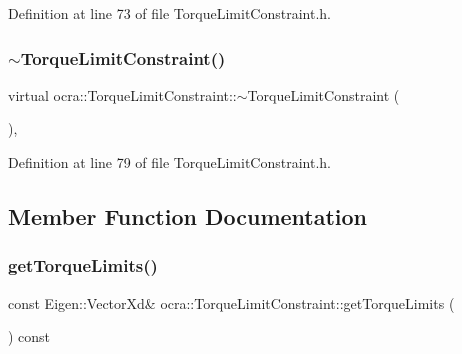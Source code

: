 Definition at line 73 of file Torque\+Limit\+Constraint.\+h.

\hypertarget{classocra_1_1TorqueLimitConstraint_a893e34cf1ab2a6faf59bf394e769bbe3}{}\label{classocra_1_1TorqueLimitConstraint_a893e34cf1ab2a6faf59bf394e769bbe3} 
\subsubsection{\texorpdfstring{$\sim$\+Torque\+Limit\+Constraint()}{~TorqueLimitConstraint()}}
{\footnotesize\ttfamily virtual ocra\+::\+Torque\+Limit\+Constraint\+::$\sim$\+Torque\+Limit\+Constraint (\begin{DoxyParamCaption}{ }\end{DoxyParamCaption})\hspace{0.3cm}{\ttfamily [inline]}, {\ttfamily [virtual]}}



Definition at line 79 of file Torque\+Limit\+Constraint.\+h.



\subsection{Member Function Documentation}
\hypertarget{classocra_1_1TorqueLimitConstraint_a34f89a0c633bf6a8cabf79f9d6d22871}{}\label{classocra_1_1TorqueLimitConstraint_a34f89a0c633bf6a8cabf79f9d6d22871} 
\subsubsection{\texorpdfstring{get\+Torque\+Limits()}{getTorqueLimits()}}
{\footnotesize\ttfamily const Eigen\+::\+Vector\+Xd\& ocra\+::\+Torque\+Limit\+Constraint\+::get\+Torque\+Limits (\begin{DoxyParamCaption}{ }\end{DoxyParamCaption}) const\hspace{0.3cm}{\ttfamily [inline]}}



